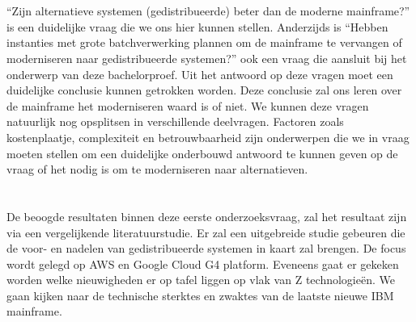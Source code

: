 \section{}
\label{sec:onderzoeksvraag}

“Zijn alternatieve systemen (gedistribueerde) beter dan de moderne mainframe?” is een duidelijke vraag die we ons hier kunnen stellen. Anderzijds is “Hebben instanties met grote batchverwerking plannen om de mainframe te vervangen of moderniseren naar gedistribueerde systemen?” ook een vraag die aansluit bij het onderwerp van deze bachelorproef. Uit het antwoord op deze vragen moet een duidelijke conclusie kunnen getrokken worden. Deze conclusie zal ons leren over de mainframe het moderniseren waard is of niet. We kunnen deze vragen natuurlijk nog opsplitsen in verschillende deelvragen. Factoren zoals kostenplaatje, complexiteit en betrouwbaarheid zijn onderwerpen die we in vraag moeten stellen om een duidelijke onderbouwd antwoord te kunnen geven op de vraag of het nodig is om te moderniseren naar alternatieven.

\section{}
\label{sec:onderzoeksdoelstelling}

\subsection{}

De beoogde resultaten binnen deze eerste onderzoeksvraag, zal het resultaat zijn via een vergelijkende literatuurstudie. Er zal een uitgebreide studie gebeuren die de voor- en nadelen van gedistribueerde systemen in kaart zal brengen. De focus wordt gelegd op AWS en Google Cloud G4 platform. Eveneens gaat er gekeken worden welke nieuwigheden er op tafel liggen op vlak van Z technologieën. We gaan kijken naar de technische sterktes en zwaktes van de laatste nieuwe IBM mainframe.

\subsection{}

